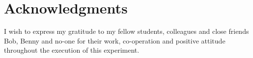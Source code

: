 \documentclass[fleqn,10pt]{SelfArx} %
\newlength{\tocsep}
\begin{document}
\section*{Acknowledgments} %
\label{sec:acknowledgments}
I wish to express my gratitude to my fellow students, colleagues and close friends Bob, Benny and no-one for their work, co-operation and positive attitude throughout the execution of this experiment.



\end{document}
